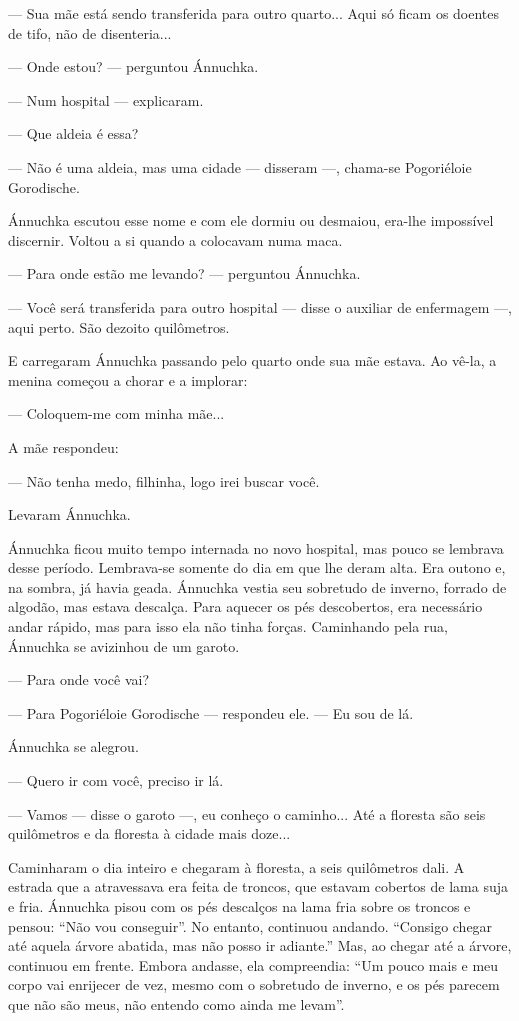 --- Sua mãe está sendo transferida para outro quarto... Aqui só ficam os
doentes de tifo, não de disenteria...

--- Onde estou? --- perguntou Ánnuchka.

--- Num hospital --- explicaram.

--- Que aldeia é essa?

--- Não é uma aldeia, mas uma cidade --- disseram ---, chama-se
Pogoriéloie Gorodische.

Ánnuchka escutou esse nome e com ele dormiu ou desmaiou, era-lhe
impossível discernir. Voltou a si quando a colocavam numa maca.

--- Para onde estão me levando? --- perguntou Ánnuchka.

--- Você será transferida para outro hospital --- disse o auxiliar de
enfermagem ---, aqui perto. São dezoito quilômetros.

E carregaram Ánnuchka passando pelo quarto onde sua mãe estava. Ao
vê-la, a menina começou a chorar e a implorar:

--- Coloquem-me com minha mãe...

A mãe respondeu:

--- Não tenha medo, filhinha, logo irei buscar você.

Levaram Ánnuchka.

Ánnuchka ficou muito tempo internada no novo hospital, mas pouco se
lembrava desse período. Lembrava-se somente do dia em que lhe deram
alta. Era outono e, na sombra, já havia geada. Ánnuchka vestia seu
sobretudo de inverno, forrado de algodão, mas estava descalça. Para
aquecer os pés descobertos, era necessário andar rápido, mas para isso
ela não tinha forças. Caminhando pela rua, Ánnuchka se avizinhou de um
garoto.

--- Para onde você vai?

--- Para Pogoriéloie Gorodische --- respondeu ele. --- Eu sou de lá.

Ánnuchka se alegrou.

--- Quero ir com você, preciso ir lá.

--- Vamos --- disse o garoto ---, eu conheço o caminho... Até a floresta
são seis quilômetros e da floresta à cidade mais doze...

Caminharam o dia inteiro e chegaram à floresta, a seis quilômetros dali.
A estrada que a atravessava era feita de troncos, que estavam cobertos
de lama suja e fria. Ánnuchka pisou com os pés descalços na lama fria
sobre os troncos e pensou: ``Não vou conseguir''. No entanto, continuou
andando. ``Consigo chegar até aquela árvore abatida, mas não posso ir
adiante.'' Mas, ao chegar até a árvore, continuou em frente. Embora
andasse, ela compreendia: ``Um pouco mais e meu corpo vai enrijecer de
vez, mesmo com o sobretudo de inverno, e os pés parecem que não são
meus, não entendo como ainda me levam''.

